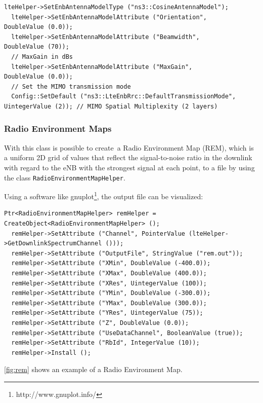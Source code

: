 \begin{lstlisting}[language=myC++,caption={Antenna \& MIMO Model}, captionpos=b]
  lteHelper->SetEnbAntennaModelType ("ns3::CosineAntennaModel");
  lteHelper->SetEnbAntennaModelAttribute ("Orientation",          DoubleValue (0.0));
  lteHelper->SetEnbAntennaModelAttribute ("Beamwidth",            DoubleValue (70));
  // MaxGain in dBs
  lteHelper->SetEnbAntennaModelAttribute ("MaxGain",              DoubleValue (0.0));
  // Set the MIMO transmission mode
  Config::SetDefault ("ns3::LteEnbRrc::DefaultTransmissionMode", UintegerValue (2)); // MIMO Spatial Multiplexity (2 layers)
\end{lstlisting}
\subsubsection{Radio Environment Maps}

With this class is possible to create a Radio Environment Map (REM), 
which is a uniform 2D grid of values that reflect the signal-to-noise ratio in the
downlink with regard to the eNB with the strongest signal at each point, to a file by 
using the class \texttt{RadioEnvironmentMapHelper}.

Using a software like gnuplot\footnote{http://www.gnuplot.info/}, the output file can be visualized:
\begin{lstlisting}[language=myC++,caption={Radio Environment Maps helper}, captionpos=b]
  Ptr<RadioEnvironmentMapHelper> remHelper = CreateObject<RadioEnvironmentMapHelper> ();
  remHelper->SetAttribute ("Channel", PointerValue (lteHelper->GetDownlinkSpectrumChannel ()));
  remHelper->SetAttribute ("OutputFile", StringValue ("rem.out"));
  remHelper->SetAttribute ("XMin", DoubleValue (-400.0));
  remHelper->SetAttribute ("XMax", DoubleValue (400.0));
  remHelper->SetAttribute ("XRes", UintegerValue (100));
  remHelper->SetAttribute ("YMin", DoubleValue (-300.0));
  remHelper->SetAttribute ("YMax", DoubleValue (300.0));
  remHelper->SetAttribute ("YRes", UintegerValue (75));
  remHelper->SetAttribute ("Z", DoubleValue (0.0));
  remHelper->SetAttribute ("UseDataChannel", BooleanValue (true));
  remHelper->SetAttribute ("RbId", IntegerValue (10));
  remHelper->Install ();
\end{lstlisting}

\autoref{fig:rem} shows an example of a Radio Environment Map.

